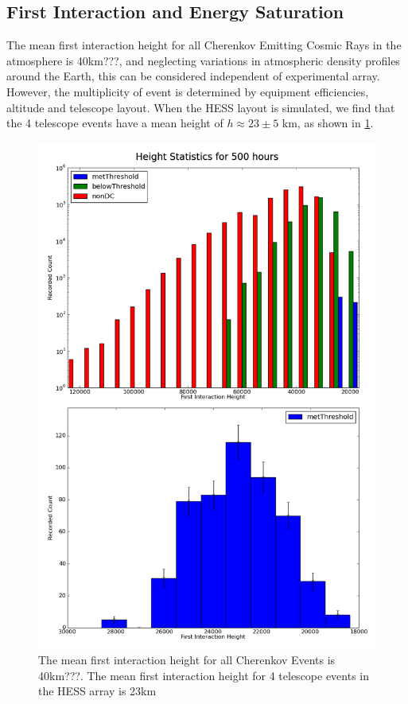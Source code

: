 \documentclass{article}
\begin{document}
\subsection{First Interaction and Energy Saturation}
The mean first interaction height for all Cherenkov Emitting Cosmic Rays in the atmosphere is 40km???, and neglecting variations in atmospheric density profiles around the Earth, this can be considered independent of experimental array. However, the multiplicity of event is determined by equipment efficiencies, altitude and telescope layout. When the HESS layout is simulated, we find that the 4 telescope events have a mean height of $h \approx 23 \pm 5$ km, as shown in \ref{fig:Hessheight}.

\begin{figure}
\begin{center}
\includegraphics[height=0.9\textheight]{hessheight}
\caption{The mean first interaction height for all Cherenkov Events is 40km???. The mean first interaction height for 4 telescope events in the HESS array is 23km}
\label{fig:Hessheight}
\end{center}
\end{figure}
\end{document}
